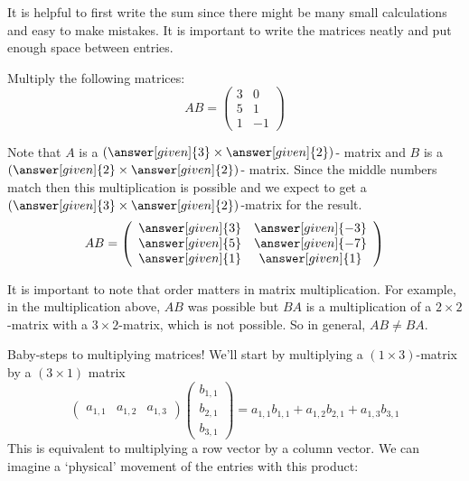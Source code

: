 \documentclass{ximera}
\begin{document}
It is helpful to first write the sum since there might be many small calculations and easy to make mistakes. It is important to write the matrices neatly and put enough space between entries.
\begin{question}
Multiply the following matrices:
\[AB = \left(\begin{array}{cc}
3 & 0 \\
5 & 1\\
1 & -1
\end{array}\right)
\]
\begin{prompt}
Note that $A$ is a $\left(\answer[given]{3}\times \answer[given]{2}\right)$- matrix and $B$ is a $\left(\answer[given]{2}\times \answer[given]{2}\right)$- matrix. Since the middle numbers match then this multiplication is possible and we expect to get a $\left(\answer[given]{3}\times \answer[given]{2}\right)$-matrix for the result.
\[AB = \left(\begin{array}{cc}
\answer[given]{3} & \answer[given]{-3}\\
\answer[given]{5} & \answer[given]{-7}\\
\answer[given]{1} & \answer[given]{1}
\end{array}\right)\]
\end{prompt}
\end{question}
It is important to note that order matters in matrix multiplication. For example, in the multiplication above, $AB$ was possible but $BA$ is a multiplication of a $2\times 2$-matrix with a $3\times 2$-matrix, which is not possible. So in general, $AB \neq BA$.




Baby-steps to multiplying matrices! We'll start by multiplying a $(1\times 3)$-matrix by a $(3\times 1)$ matrix
\[
\begin{pmatrix} a_{1,1} & a_{1,2} & a_{1,3} \end{pmatrix}
\begin{pmatrix} b_{1,1} \\ b_{2,1} \\ b_{3,1} \end{pmatrix} = a_{1,1}b_{1,1} + a_{1,2}b_{2,1} + a_{1,3}b_{3,1}
\]
This is equivalent to multiplying a row vector by a column vector. We
can imagine a `physical' movement of the entries with this product:
\end{document}
